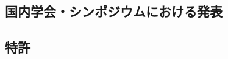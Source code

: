 \documentclass[11pt,a4paper,uplatex,twoside,dvipdfmx]{ujarticle} 	%
\renewcommand{\emph}[1]{{\sffamily\gtfamily\bfseries #1}}
\newcommand{\研究課題名}{\mgfamily ストカスティック形式、原始ブラックホール、重力波観測から迫るインフレーション}
\newcommand{\研究機関名}{\mgfamily 名古屋大学}
\newcommand{\申請者氏名}{\mgfamily 多田 祐一郎}
\newcommand{\研究代表者氏名}{\申請者氏名}
\newcommand{\研究期間の最終元号年度}{34}	%
\begin{document}
\subsection{国内学会・シンポジウムにおける発表}
\newcommand{\国内学会やシンポジウムにおける発表}{%
	
	\vspace{-5pt}
	\begin{enumerate} \itemsep-1mm
		\item[] (口頭・招待)
		\item 川崎雅裕, \ul{多田祐一郎},
		``Can massive primordial black holes be produced in mild waterfall hybrid inflation?",
		松江素粒子物理学研究会, 島根大学,
		2016年3月
		\item[] (口頭・査読なし)
		\item 北嶋直弥, \ul{多田祐一郎}, 高橋史宜,
		「極長ストカスティックインフレーション」,
		日本物理学会 第75回年次大会, 名古屋大学
		2020年3月
		\item[] \emph{他8件}
	\end{enumerate}
	
}

\subsection{特許}
\newcommand{\特許等}{%
	$\,\,$なし

}
\end{document}

